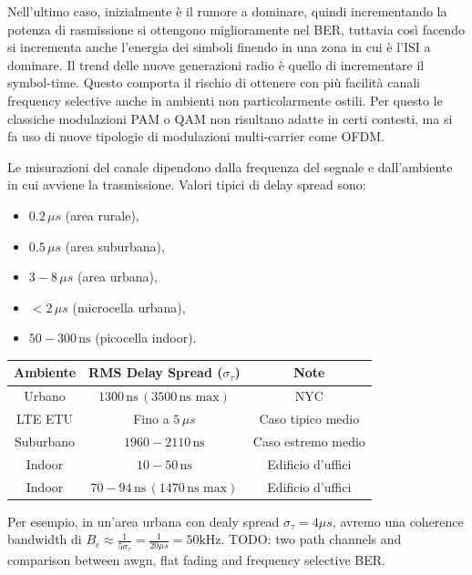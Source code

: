 Nell'ultimo caso, inizialmente è il rumore a dominare, quindi incrementando la potenza di rasmissione si ottengono miglioramente nel BER, tuttavia così facendo si incrementa anche l'energia dei simboli finendo in una zona in cui è l'ISI a dominare.
Il trend delle nuove generazioni radio è quello di incrementare il symbol-time. Questo comporta il rischio di ottenere con più facilità canali frequency selective anche in ambienti non particolarmente ostili. Per questo le classiche modulazioni PAM o QAM non risultano adatte in certi contesti, ma si fa uso di nuove tipologie di modulazioni multi-carrier come OFDM.


Le misurazioni del canale dipendono dalla frequenza del segnale e dall'ambiente in cui avviene la trasmissione.
Valori tipici di delay spread sono:

\begin{itemize}
    \item $0.2 \, \mu s$ (area rurale),
    \item $0.5 \, \mu s$ (area suburbana),
    \item $3-8 \, \mu s$ (area urbana),
    \item $<2 \, \mu s$ (microcella urbana),
    \item $50-300 \, \text{ns}$ (picocella indoor).
\end{itemize}

\begin{center}
    \begin{tabular}{|c|c|c|}
        \hline
        \textbf{Ambiente} & \textbf{RMS Delay Spread ($\sigma_\tau$)} & \textbf{Note} \\
        \hline
        Urbano & $1300 \, \text{ns} \, (3500 \, \text{ns max})$ & NYC \\
        LTE ETU & Fino a $5 \, \mu s$ & Caso tipico medio \\
        Suburbano & $1960-2110 \, \text{ns}$ & Caso estremo medio \\
        Indoor & $10-50 \, \text{ns}$ & Edificio d'uffici \\
        Indoor & $70-94 \, \text{ns} \, (1470 \, \text{ns max})$ & Edificio d'uffici \\
        \hline
    \end{tabular}
\end{center}


Per esempio, in un'area urbana con dealy spread $\sigma_\tau = 4 \mu s$, avremo una coherence bandwidth di $B_c \approx \frac{1}{5 \sigma_\tau} = \frac{1}{20 \mu s} = 50 \text{kHz}$.
TODO: two path channels and comparison between awgn, flat fading and frequency selective BER.
